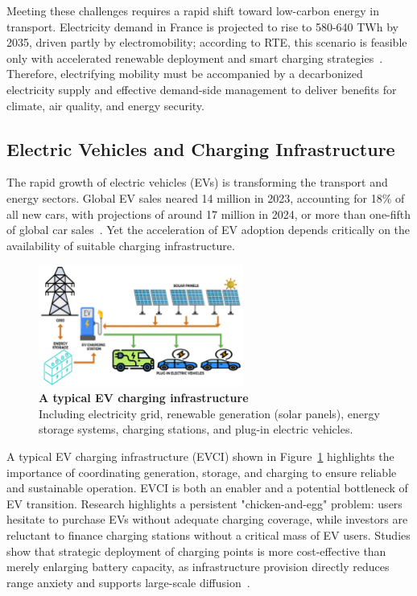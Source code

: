 Meeting these challenges requires a rapid shift toward low-carbon energy in transport. Electricity demand in France is projected to rise to 580-640 TWh by 2035, driven partly by electromobility; according to RTE, this scenario is feasible only with accelerated renewable deployment and smart charging strategies~\cite{RTE2023_Demand2035}. Therefore, electrifying mobility must be accompanied by a decarbonized electricity supply and effective demand-side management to deliver benefits for climate, air quality, and energy security.


\subsection{Electric Vehicles and Charging Infrastructure}

The rapid growth of electric vehicles (EVs) is transforming the transport and 
energy sectors. Global EV sales neared 14 million in 2023, accounting for 18\% of 
all new cars, with projections of around 17 million in 2024, or more than one-fifth 
of global car sales~\cite{IEA2024}. Yet the acceleration of EV adoption depends 
critically on the availability of suitable charging infrastructure.

\begin{figure}[ht!]
    \centering
    \includegraphics[width=0.6\textwidth]{Images/EVCI_diagram.png}
    \caption{\textbf{A typical EV charging infrastructure}~\cite{Deeum2023} \\Including electricity grid, 
    renewable generation (solar panels), energy storage systems, charging stations, 
    and plug-in electric vehicles. }
    \label{fig:EVCI_diagram}
\end{figure}

A typical EV charging infrastructure (EVCI) shown in Figure~\ref{fig:EVCI_diagram} highlights the importance of coordinating generation, storage, and charging to ensure reliable and sustainable operation. EVCI is both an enabler and a potential bottleneck of EV 
transition. Research highlights a persistent "chicken-and-egg" problem: users 
hesitate to purchase EVs without adequate charging coverage, while investors 
are reluctant to finance charging stations without a critical mass of EV users. 
Studies show that strategic deployment of charging points is more cost-effective 
than merely enlarging battery capacity, as infrastructure provision directly reduces 
range anxiety and supports large-scale diffusion~\cite{Metais2022}. 

